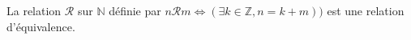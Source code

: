 La relation $\mathcal R$ sur $\mathbb N$ définie par $n\mathcal R m \iff (\exists k\in\mathbb Z,n=k+m))$ est une relation d'équivalence.

\begin{reponses}
\end{reponses}

